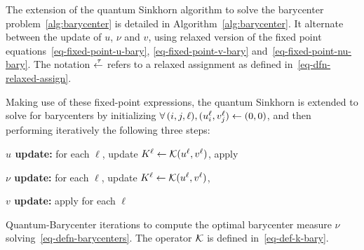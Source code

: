 The extension of the quantum Sinkhorn algorithm to solve the barycenter problem~\eqref{alg:barycenter} is detailed in Algorithm~\ref{alg:barycenter}. It alternate between the update of $u$, $\nu$ and $v$, using relaxed version of the fixed point equations~\eqref{eq-fixed-point-u-bary}, \eqref{eq-fixed-point-v-bary} and~\eqref{eq-fixed-point-nu-bary}. The notation $\overset{\;\tau}{\leftarrow}$ refers to a relaxed assignment as defined in~\eqref{eq-dfn-relaxed-assign}. 

Making use of these fixed-point expressions, the quantum Sinkhorn is extended to solve for barycenters by initializing $\forall \, (i,j,\ell), (u_i^\ell,v_j^\ell) \leftarrow (0,0)$, and then performing iteratively the following three steps:
\begin{rs}
	\item \textbf{$u$ update:}  for each $\ell$, update $K^\ell \leftarrow \mathcal{K}(u^\ell,v^\ell)$, apply
	\item \textbf{$\nu$ update:} for each $\ell$, update $K^\ell \leftarrow \mathcal{K}(u^\ell,v^\ell)$, 
	\item \textbf{$v$ update:} apply for each $\ell$
\end{rs}
\fi

\begin{algorithm}[t]
\fbox{\hspace{-.1in}\parbox{\columnwidth}{%
\begin{algorithmic}
\Function{Quantum-Barycenter}{$(\mu_\ell)_{\ell=1}^L,c,\epsilon,\rho$}
	\algspace
	\State Choose $\tau_1 \in ]0,\tfrac{2 \epsilon}{\epsilon+\rho}[$, 
		$\tau_2 \in ]0,2[$.
	\Let{$\foralls (i,j) \in I \times J, \quad (u_i,v_j)$}{$(0_{d \times d}, 0_{d \times d})$}
	\For{$s=1,2,3,\ldots$.}
		\For{$\ell=1,\ldots,L$}
			\Let{$K^\ell$}{$\Kern(u^\ell,v^\ell)$, }
			\State $\foralls i \in I, \quad u_i^\ell \RelaxAssign{\tau_1} \LSE_j(K_{i,j}^\ell)-\log(\mu_i^\ell)$, 
			\Let{$K^\ell$}{$\Kern(u^\ell,v^\ell)$.}
		\EndFor
		\State $\foralls j \in J, \quad \log(\nu_j) \leftarrow 
			\sum_\ell w_\ell ( \LSE_i(K_{i,j}^\ell) + v^\ell_j/\epsilon ).$
		\For{$\ell=1,\ldots,L$}
			\State $\foralls j \in J, \quad v_j^\ell \RelaxAssign{\tau_2} \epsilon \LSE_i(K_{i,j}^\ell) + v^\ell_j - \epsilon \log(\nu_j).$	
		\EndFor		
	\EndFor
	\State\Return{$\nu$}
\EndFunction
  \end{algorithmic}
}}
\caption{Quantum-Barycenter iterations to compute the optimal barycenter measure $\nu$ solving~\eqref{eq-defn-barycenters}. The operator $\mathcal{K}$ is defined in~\eqref{eq-def-k-bary}. \label{alg:barycenter}}
\end{algorithm}




